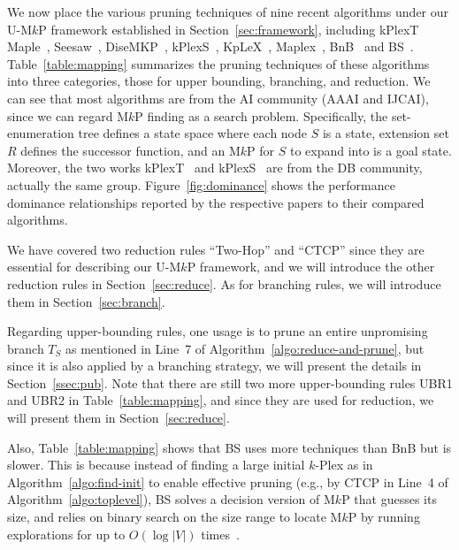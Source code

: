 \documentclass[sigconf, nonacm]{acmart}
\begin{document}
\vspace{1mm}
 We now place the various pruning techniques of nine recent algorithms under our U-M$k$P framework established in Section~\ref{sec:framework}, including kPlexT~\cite{kPlexT} Maple~\cite{Maple}, Seesaw~\cite{seesaw}, DiseMKP~\cite{DiseMKP}, kPlexS~\cite{kPlexS}, KpLeX~\cite{KpLeX-MKP}, Maplex~\cite{Maplex}, BnB~\cite{BnB} and BS~\cite{BS}. Table~\ref{table:mapping} summarizes the pruning techniques of these algorithms into three categories, those for upper bounding, branching, and reduction. We can see that most algorithms are from the AI community (AAAI and IJCAI), since we can regard M$k$P finding as a search problem. Specifically, the set-enumeration tree defines a state space where each node $S$ is a state, extension set $R$ defines the successor function, and an M$k$P for $S$ to expand into is a goal state. Moreover, the two works kPlexT~\cite{kPlexT} and kPlexS~\cite{kPlexS} are from the DB community, actually the same group. Figure~\ref{fig:dominance} shows the performance dominance relationships reported by the respective papers to their compared algorithms.

We have covered two reduction rules ``Two-Hop'' and ``CTCP'' since they are essential for describing our U-M$k$P framework, and we will introduce the other reduction rules in Section~\ref{sec:reduce}. As for branching rules, we will introduce them in Section~\ref{sec:branch}.

Regarding upper-bounding rules, one usage is to prune an entire unpromising branch $T_S$ as mentioned in Line~7 of Algorithm~\ref{algo:reduce-and-prune}, but since it is also applied by a branching strategy, we will present the details in Section~\ref{ssec:pub}. 
Note that there are still two more upper-bounding rules UBR1 and UBR2 in Table~\ref{table:mapping}, and since they are used for reduction, we will present them in Section~\ref{sec:reduce}. 

Also, Table~\ref{table:mapping} shows that BS uses more techniques than BnB but is slower. This is because instead of finding a large initial $k$-Plex as in Algorithm~\ref{algo:find-init} to enable effective pruning (e.g., by CTCP in Line~4 of Algorithm~\ref{algo:toplevel}), BS solves a decision version of M$k$P that guesses its size, and relies on binary search on the size range to locate M$k$P by running explorations for up to $O(\log |V|)$ times~\cite{BS}.

\vspace{-2mm}
\end{document}
